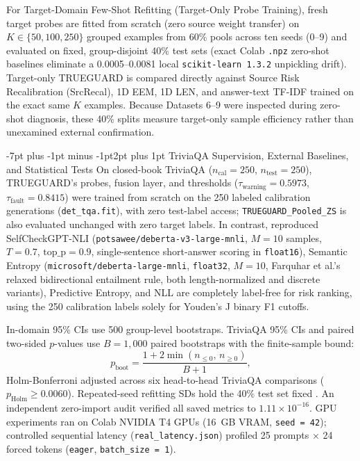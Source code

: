 \documentclass[10pt,twocolumn,letterpaper]{article}
\makeatletter
\renewcommand{\subsection}{\@startsection{subsection}{2}{\z@}%
  {-7pt plus -1pt minus -1pt}{2pt plus 1pt}%
  {\normalfont\normalsize\itshape\color{black}}}
\makeatother
\begin{document}
For Target-Domain Few-Shot Refitting (Target-Only Probe Training), fresh target probes are fitted from scratch (zero source weight transfer) on $K \in \{50, 100, 250\}$ grouped examples from 60\% pools across ten seeds (0--9) and evaluated on fixed, group-disjoint 40\% test sets (exact Colab \texttt{.npz} zero-shot baselines eliminate a 0.0005--0.0081 local \texttt{scikit-learn 1.3.2} unpickling drift). Target-only TRUEGUARD is compared directly against Source Risk Recalibration (SrcRecal), 1D EEM, 1D LEN, and answer-text TF-IDF trained on the exact same $K$ examples. Because Datasets 6--9 were inspected during zero-shot diagnosis, these 40\% splits measure target-only sample efficiency rather than unexamined external confirmation.

\subsection{TriviaQA Supervision, External Baselines, and Statistical Tests}
On closed-book TriviaQA ($n_{\text{cal}} = 250$, $n_{\text{test}} = 250$), TRUEGUARD's probes, fusion layer, and thresholds ($\tau_{\text{warning}} = 0.5973$, $\tau_{\text{fault}} = 0.8415$) were trained from scratch on the 250 labeled calibration generations (\texttt{det\_tqa.fit}), with zero test-label access; \texttt{TRUEGUARD\_Pooled\_ZS} is also evaluated unchanged with zero target labels. In contrast, reproduced SelfCheckGPT-NLI \cite{review21} (\texttt{potsawee/\allowbreak deberta-v3-large-mnli}, $M = 10$ samples, $T = 0.7$, $\text{top\_p} = 0.9$, single-sentence short-answer scoring in \texttt{float16}), Semantic Entropy \cite{kuhn2023semantic,farquhar2024detecting} (\texttt{microsoft/\allowbreak deberta-large-mnli}, \texttt{float32}, $M = 10$, Farquhar et al.'s relaxed bidirectional entailment rule, both length-normalized and discrete variants), Predictive Entropy, and NLL are completely label-free for risk ranking, using the 250 calibration labels solely for Youden's J binary F1 cutoffs.

In-domain 95\% CIs use 500 group-level bootstraps. TriviaQA 95\% CIs and paired two-sided $p$-values use $B = 1{,}000$ paired bootstraps with the finite-sample bound:
\begin{equation}
p_{\text{boot}} = \frac{1 + 2 \min(n_{\le 0},\, n_{\ge 0})}{B + 1},
\label{eq:pboot}
\end{equation}
Holm-Bonferroni adjusted across six head-to-head TriviaQA comparisons ($p_{\text{Holm}} \ge 0.0060$). Repeated-seed refitting SDs hold the 40\% test set fixed \cite{nadeau2003inference}. An independent zero-import audit verified all saved metrics to $1.11 \times 10^{-16}$. GPU experiments ran on Colab NVIDIA T4 GPUs (16~GB VRAM, \texttt{seed = 42}); controlled sequential latency (\texttt{real\_latency.json}) profiled 25 prompts $\times$ 24 forced tokens (\texttt{eager}, \texttt{batch\_size = 1}).
\end{document}
